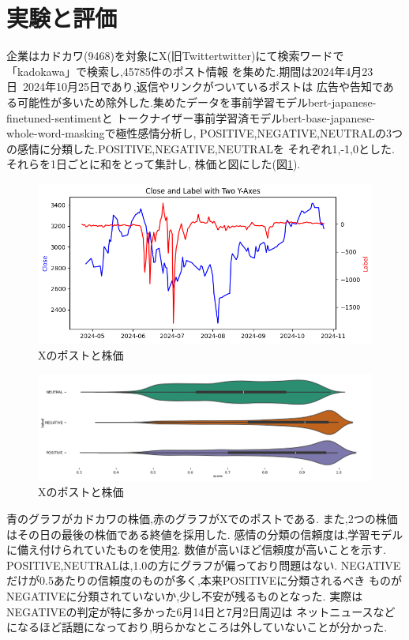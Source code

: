 \documentclass[11pt]{jarticle}
\begin{document}
\section{実験と評価}
企業はカドカワ(9468)を対象にX(旧Twittertwitter)にて検索ワードで「kadokawa」で検索し,45785件のポスト情報
を集めた.期間は2024年4月23日~2024年10月25日であり,返信やリンクがついているポストは
広告や告知である可能性が多いため除外した.集めたデータを事前学習モデルbert-japanese-finetuned-sentimentと
トークナイザー事前学習済モデルbert-base-japanese-whole-word-maskingで極性感情分析し,
POSITIVE,NEGATIVE,NEUTRALの3つの感情に分類した.POSITIVE,NEGATIVE,NEUTRALを
それぞれ1,-1,0とした.それらを1日ごとに和をとって集計し,
株価と図にした(図\ref{fig:KadvsLabel}).
\begin{figure}[htbp]
	\centering
	\includegraphics[scale=0.4]{image/KadvsLabel.png}
	
	\caption{Xのポストと株価}
	\label{fig:KadvsLabel}
\end{figure}
\begin{figure}[htbp]
	\centering
	\includegraphics[scale=0.3]{image/score.png}
	
	\caption{Xのポストと株価}
	\label{fig:score}
\end{figure}
青のグラフがカドカワの株価,赤のグラフがXでのポストである.
また,2つの株価はその日の最後の株価である終値を採用した.
感情の分類の信頼度は,学習モデルに備え付けられていたものを使用\ref{fig:score}.
数値が高いほど信頼度が高いことを示す.
POSITIVE,NEUTRALは,1.0の方にグラフが偏っており問題はない.
NEGATIVEだけが0.5あたりの信頼度のものが多く,本来POSITIVEに分類されるべき
ものがNEGATIVEに分類されていないか,少し不安が残るものとなった.
実際はNEGATIVEの判定が特に多かった6月14日と7月2日周辺は
ネットニュースなどになるほど話題になっており,明らかなところは外していないことが分かった.
\end{document}
